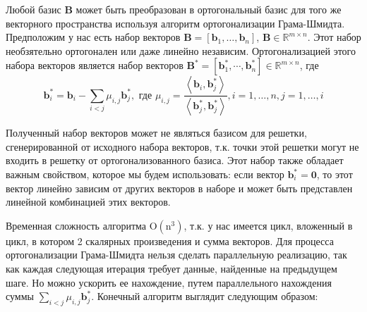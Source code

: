Любой базис $ \mathbf{B} $ может быть преобразован в ортогональный базис для того же векторного пространства используя алгоритм ортогонализации Грама-Шмидта.
Предположим у нас есть набор векторов $ \mathbf{B} = [\mathbf{b}_1, \ldots, \mathbf{b}_n] $, $ \mathbf{B} \in \mathbb{R}^{m \times n} $. Этот набор необзятельно ортогонален или даже линейно независим. Ортогонализацией этого набора векторов является набор векторов $ \mathbf{B}^* = [\mathbf{b}^*_1, \cdots, \mathbf{b}^*_n] \in \mathbb{R}^{m \times n} $, где $$ \mathbf{b}^*_i = \mathbf{b}_i - \sum_{i < j} \mu_{i, j} \mathbf{b}^*_j, \text{ где } \mu_{i, j} = \frac{\left\langle \mathbf{b}_i, \mathbf{b}^*_j \right\rangle}{\left\langle \mathbf{b}^*_j, \mathbf{b}^*_j \right\rangle}, i = 1, \ldots, n, j = 1, \ldots, i $$

Полученный набор векторов может не являться базисом для решетки, сгенерированной от исходного набора векторов, т.к. точки этой решетки могут не входить в решетку от ортогонализованного базиса. Этот набор также обладает важным свойством, которое мы будем использовать: если вектор $ \mathbf{b}^*_i = \mathbf{0} $, то этот вектор линейно зависим от других векторов в наборе и может быть представлен линейной комбинацией этих векторов.

Временная сложность алгоритма $ \mathrm{O(n^3)} $, т.к. у нас имеется цикл, вложенный в цикл, в котором 2 скалярных произведения и сумма векторов. Для процесса ортогонализации Грама-Шмидта нельзя сделать параллельную реализацию, так как каждая следующая итерация требует данные, найденные на предыдущем шаге. Но можно ускорить ее нахождение, путем параллельного нахождения суммы $ \sum_{i < j} \mu_{i, j} \mathbf{b}^*_j $. Конечный алгоритм выглядит следующим образом:

\begin{algorithmic}

	
	\EndFor
	
\EndFor
\end{algorithmic}

